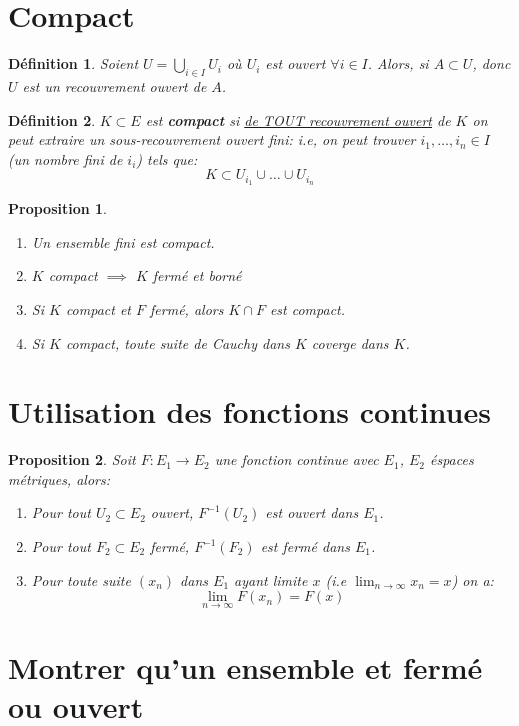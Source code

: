 \documentclass[a4paper]{article}
\newtheorem{definition}{Définition}[section]
\newtheorem{proposition}{Proposition}[section]
\begin{document}
\section{Compact}
\begin{definition}
    Soient $U = \bigcup_{i \in I} U_i$ où $U_i$ est ouvert  $\forall i \in I$. Alors, si $A \subset U$, donc $U$ est un recouvrement ouvert de  $A$.
\end{definition}
\begin{definition}
    $K \subset E$ est \textbf{compact} si \underline{de TOUT recouvrement ouvert} de $K$ on peut extraire un sous-recouvrement ouvert fini: i.e, on peut trouver $i_1, \ldots, i_n \in I$ (un nombre fini de $i_i$) tels que:
    \[
        K \subset U_{i_1} \cup \ldots \cup U_{i_n}
    \] 
\end{definition}
\begin{proposition}
   \begin{enumerate}
       \item Un ensemble fini est compact.
       \item $K$ compact $\implies$ $K$ fermé et borné
       \item Si $K$ compact et $F$ fermé, alors  $K \cap F$ est compact.
       \item Si  $K$ compact, toute suite de Cauchy dans  $K$ coverge dans  $K$.
   \end{enumerate} 
\end{proposition}
\section{Utilisation des fonctions continues}
\begin{proposition}
   Soit $F: E_1 \to  E_2$ une fonction continue avec $E_1$, $E_2$ éspaces métriques, alors:
   \begin{enumerate}
       \item Pour tout $U_2 \subset E_2$ ouvert, $F^{-1}(U_2)$ est ouvert dans $E_1$.
       \item Pour tout $F_2 \subset E_2$ fermé, $F^{-1}(F_2)$ est fermé dans $E_1$. 
       \item Pour toute suite $(x_n)$ dans  $E_1$ ayant limite $x$ (i.e $\lim_{n \to \infty} x_n = x$) on a:
           \[
           \lim_{n \to \infty} F(x_n) = F(x)
           \] 
   \end{enumerate}
\end{proposition}

\section{Montrer qu'un ensemble et fermé ou ouvert}
\end{document}
